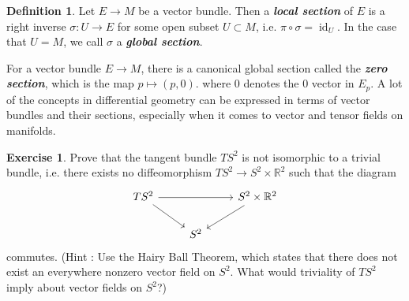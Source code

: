 \documentclass[psamsfonts]{amsart}
\theoremstyle{definition}
\newtheorem{defn}[thm]{Definition}
\newtheorem{exer}[thm]{Exercise}
\theoremstyle{remark}
\newcommand{\R}{\mathbb{R}}
\newcommand{\ib}[1]{\textbf{\textit{#1}}}
\DeclareMathOperator{\id}{id}
\begin{document}
%
\begin{defn}
Let $E \to M$ be a vector bundle. Then a \ib{local section} of $E$ is
a right inverse $\sigma:U \to E$ for some open subset $U \subset M$, i.e.
$\pi \circ \sigma = \id_U$. In the case that $U = M$, we call $\sigma$ a
\ib{global section}.
\end{defn}
%
For a vector bundle $E \to M$, there is a canonical global section called
the \ib{zero section}, which is the map $p \mapsto (p, 0)$. where $0$
denotes the $0$ vector in $E_p$. A lot of the concepts in differential
geometry can be expressed in terms of vector bundles and their sections,
especially when it comes to vector and tensor fields on manifolds.
%
\begin{exer}
	Prove that the tangent bundle $TS^2$ is not isomorphic to a trivial
	bundle, i.e. there exists no diffeomorphism $TS^2 \to S^2 \times \R^2$
	such that the diagram
	$$\begin{tikzcd}
	TS^2 \ar[dr]\ar[rr] && S^2 \times \R^2 \ar[dl]\\
	& S^2
	\end{tikzcd}$$
	commutes. (Hint : Use the Hairy Ball Theorem, which states that
	there does not exist an everywhere nonzero vector field on $S^2$.
	What would triviality of $TS^2$ imply about vector fields on $S^2$?)
\end{exer}
%
\end{document}
